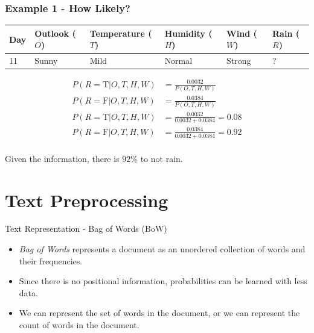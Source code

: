 \documentclass[aspectratio=169, 10pt]{beamer}
\begin{document}
\begin{frame}[t]
    \frametitle{Example 1 - How Likely?}
    \begin{table}[]
        \small
        \begin{tabular}{l|llll|l}
        \textbf{Day} & \textbf{Outlook} ($O$) & \textbf{Temperature} ($T$) & \textbf{Humidity} ($H$) & \textbf{Wind} ($W$) & \textbf{Rain} ($R$) \\ \hline
        11           & Sunny            & Mild                 & Normal            & Strong        & ?            
        \end{tabular}
    \end{table}

    \begin{align*}
        P(R=\text{T}|O,T,H,W) & = \frac{0.0032}{P(O,T,H,W)}\\
        P(R=\text{F}|O,T,H,W) & = \frac{0.0384}{P(O,T,H,W)}\\
        P(R=\text{T}|O,T,H,W) & = \frac{0.0032}{0.0032 + 0.0384} = 0.08\\
        P(R=\text{F}|O,T,H,W) & = \frac{0.0384}{0.0032 + 0.0384} = 0.92\\
    \end{align*}

    Given the information, there is $92\%$ to not rain.
\end{frame}

\section{Text Preprocessing}
\begin{frame}{Text Representation - Bag of Words (BoW)}
    \begin{itemize}
        \item \textit{Bag of Words} represents a document as an unordered collection of words and their frequencies.
        \item Since there is no positional information, probabilities can be learned with less data.
        \item We can represent the set of words in the document, or we can represent the count of words in the document.
    \end{itemize}
\end{frame}
\end{document}
